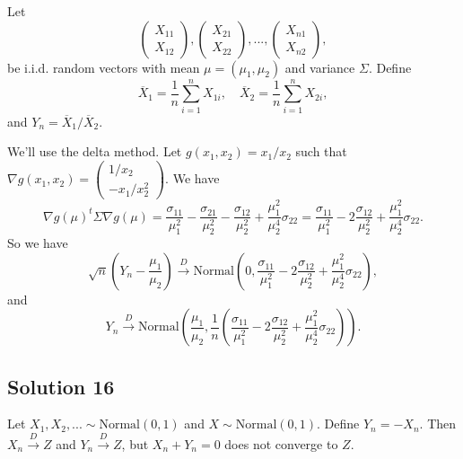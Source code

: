 Let
\begin{equation*}
    \left( \begin{array}{cc} X_{11} \\ X_{12} \end{array} \right),
    \left( \begin{array}{cc} X_{21} \\ X_{22} \end{array} \right),
    ...,
    \left( \begin{array}{cc} X_{n1} \\ X_{n2} \end{array} \right),
\end{equation*}
be i.i.d. random vectors with mean $\mu = (\mu_1, \mu_2)$ and variance $\Sigma$.
Define
\begin{equation*}
    \overline{X}_1 = \frac{1}{n} \sum_{i = 1}^n X_{1i}, \quad
    \overline{X}_2 = \frac{1}{n} \sum_{i = 1}^n X_{2i},
\end{equation*}
and $Y_n = \overline{X}_1 / \overline{X}_2$.

We'll use the delta method.
Let $g(x_1, x_2) = x_1 / x_2$ such that $\nabla g(x_1, x_2) = \left( \begin{array}{cc} 1 / x_2 \\ -x_1 / x_2^2 \end{array} \right)$.
We have
\begin{equation*}
    \nabla g(\mu)^t \Sigma \nabla g(\mu)
        = \frac{\sigma_{11}}{\mu_1^2} - \frac{\sigma_{21}}{\mu_2^2} - \frac{\sigma_{12}}{\mu_2^2} + \frac{\mu_1^2}{\mu_2^4} \sigma_{22}
        = \frac{\sigma_{11}}{\mu_1^2} - 2 \frac{\sigma_{12}}{\mu_2^2} + \frac{\mu_1^2}{\mu_2^4} \sigma_{22}.
\end{equation*}
So we have
\begin{equation*}
    \sqrt{n}\left(Y_n - \frac{\mu_1}{\mu_2}\right)
        \xrightarrow{D} \mathrm{Normal}\left(
            0,
            \frac{\sigma_{11}}{\mu_1^2} - 2 \frac{\sigma_{12}}{\mu_2^2} + \frac{\mu_1^2}{\mu_2^4} \sigma_{22}
        \right),
\end{equation*}
and
\begin{equation*}
    Y_n \xrightarrow{D} \mathrm{Normal}\left(
        \frac{\mu_1}{\mu_2},
        \frac{1}{n} \left(\frac{\sigma_{11}}{\mu_1^2} - 2 \frac{\sigma_{12}}{\mu_2^2} + \frac{\mu_1^2}{\mu_2^4} \sigma_{22}\right)
    \right).
\end{equation*}


\subsection*{Solution 16}

Let $X_1, X_2, ... \sim \mathrm{Normal}(0, 1)$ and $X \sim \mathrm{Normal}(0, 1)$.
Define $Y_n = -X_n$.
Then $X_n \xrightarrow{D} Z$ and $Y_n \xrightarrow{D} Z$, but $X_n + Y_n = 0$ does not converge to $Z$.
